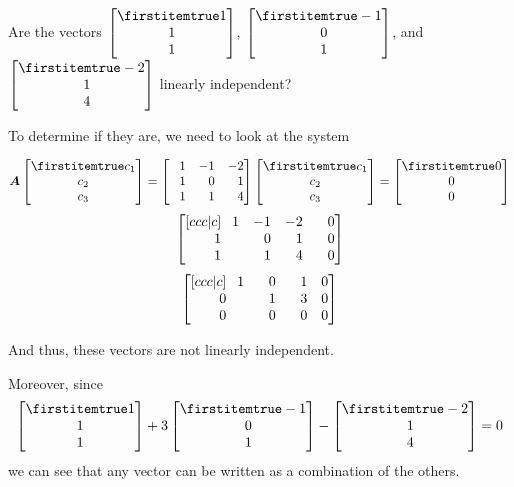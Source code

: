 \documentclass{beamer}
\begin{document}
\begin{frame}
\begin{example}
Are the vectors $\bvector{1,1,1}$, $\bvector{-1,\+0, \+1}$, and $\bvector{-2,\+1,\+4}$ linearly independent?

To determine if they are, we need to look at the system
\begin{overprint}
\begin{equation*}
\mat{A}\bvector{c_1,c_2,c_3}=
\begin{bmatrix}
\+1 &  -1 &  -2 \\
\+1 & \+0 & \+1 \\
\+1 & \+1 & \+4 \\
\end{bmatrix}
\bvector{c_1,c_2,c_3}=\bvector{0,0,0}
\end{equation*}
\begin{equation*}
\begin{bmatrix}[ccc|c]
\+1 &  -1 &  -2 & \+0 \\
\+1 & \+0 & \+1 & \+0 \\
\+1 & \+1 & \+4 & \+0 \\
\end{bmatrix}
\end{equation*}
\begin{equation*}
\begin{bmatrix}[ccc|c]
\+1 & \+0 & \+1 & 0 \\
\+0 & \+1 & \+3 & 0 \\
\+0 & \+0 & \+0 & 0 \\
\end{bmatrix}
\end{equation*}
\end{overprint}

And thus, these vectors are not linearly independent.  

\vspace{2mm}
Moreover, since
\begin{equation*}
\bvector{1,1,1} +3\bvector{-1,\+0,\+1}-\bvector{-2,\+1,\+4}=0
\end{equation*}
we can see that any vector can be written as a combination of the others.
\end{example}
\end{frame}
\end{document}
